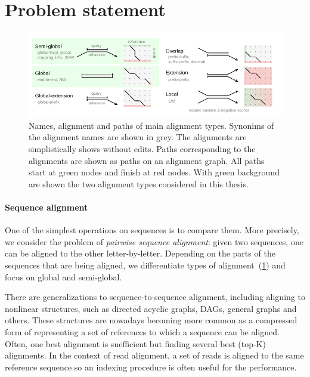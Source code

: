 \section*{Problem statement}

\begin{figure}[t]  %
    \includegraphics[width=\textwidth]{alignment-types-thesis.pdf}
	\caption[Main alignment types]{Names, alignment and paths of main alignment
    types. Synonims of the alignment names are shown in grey. The alignments are
    simplistically shows without edits. Paths corresponding to the alignments
    are shown as paths on an alignment graph. All paths start at green nodes and
    finish at red nodes. With green background are shown the two alignment types
    considered in this thesis.}
    \label{fig:alignment-types}
\end{figure}

\paragraph{Sequence alignment}
One of the simplest operations on sequences is to compare them. More precisely,
we consider the problem of \emph{pairwise sequence alignment}: given two
sequences, one can be aligned to the other letter-by-letter. Depending on the
parts of the sequences that are being aligned, we differentiate types of
alignment~(\cref{fig:alignment-types}) and focus on global and semi-global.

There are generalizations to sequence-to-sequence alignment, including aligning
to nonlinear structures, such as directed acyclic graphs, DAGs, general graphs
and others. These structures are nowadays becoming more common as a compressed
form of representing a set of references to which a sequence can be aligned.
Often, one best alignment is suefficient but finding several best (top-K)
alignments. In the context of read alignment, a set of reads is aligned to the
same reference sequence so an indexing procedure is often useful for the
performance.

